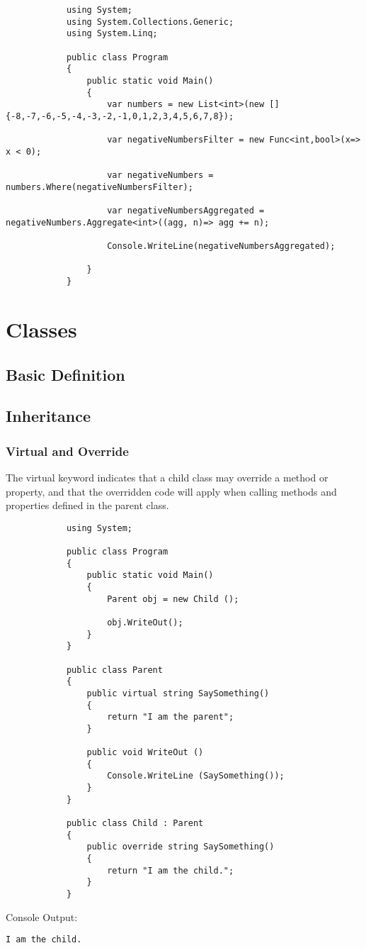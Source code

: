 \documentclass {amsart}
\begin{document}
	\begin{lstlisting}
			using System;
			using System.Collections.Generic;
			using System.Linq;
			
			public class Program
			{
				public static void Main()
				{
					var numbers = new List<int>(new [] {-8,-7,-6,-5,-4,-3,-2,-1,0,1,2,3,4,5,6,7,8});
			
					var negativeNumbersFilter = new Func<int,bool>(x=> x < 0);
			
					var negativeNumbers = numbers.Where(negativeNumbersFilter);
			
					var negativeNumbersAggregated = negativeNumbers.Aggregate<int>((agg, n)=> agg += n);
			
					Console.WriteLine(negativeNumbersAggregated);
					
				}
			}
	\end{lstlisting}



\section{Classes}
	\subsection{Basic Definition}
	\subsection{Inheritance}
		\subsubsection{Virtual and Override}  The virtual keyword indicates that a child class may override a method or property, and that the overridden code will apply when calling methods and properties defined in the parent class. 
			\begin{lstlisting}
			using System;
								
			public class Program
			{
				public static void Main()
				{
					Parent obj = new Child ();
					
					obj.WriteOut();
				}
			}

			public class Parent 
			{
				public virtual string SaySomething()
				{
					return "I am the parent";		
				}
				
				public void WriteOut () 
				{
					Console.WriteLine (SaySomething());	
				}
			}

			public class Child : Parent
			{
				public override string SaySomething()
				{
					return "I am the child.";		
				}
			}
			\end{lstlisting}
		Console Output:
		\begin{verbatim}I am the child.\end{verbatim}
\end{document}
